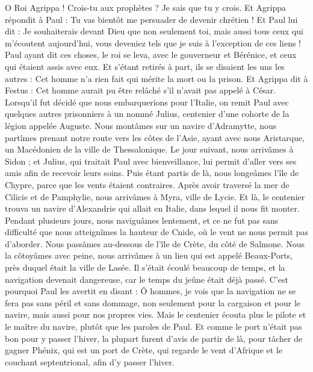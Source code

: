 \begin{multicols}{2}
O Roi Agrippa ! Crois-tu aux prophètes ? Je sais que tu y crois.
Et Agrippa répondit à Paul : Tu vas bientôt me persuader de devenir chrétien !
Et Paul lui dit : Je souhaiterais devant Dieu que non seulement toi, mais aussi tous ceux qui m'écoutent aujourd'hui, vous deveniez tels que je suis à l’exception de ces liens !
Paul ayant dit ces choses, le roi se leva, avec le gouverneur et Bérénice, et ceux qui étaient assis avec eux.
Et s’étant retirés à part, ils se disaient les uns les autres : Cet homme n'a rien fait qui mérite la mort ou la prison.
Et Agrippa dit à Festus : Cet homme aurait pu être relâché s'il n'avait pas appelé à César.
\VerseOne{}Lorsqu’il fut décidé que nous embarquerions pour l’Italie, on remit Paul avec quelques autres prisonniers à un nommé Julius, centenier d'une cohorte de la légion appelée Auguste.
Nous montâmes sur un navire d'Adramytte, nous partîmes prenant notre route vers les côtes de l'Asie, ayant avec nous Aristarque, un Macédonien de la ville de Thessalonique.
Le jour suivant, nous arrivâmes à Sidon ; et Julius, qui traitait Paul avec bienveillance, lui permit d'aller vers ses amis afin de recevoir leurs soins.
Puis étant partis de là, nous longeâmes l’île de Chypre, parce que les vents étaient contraires.
Après avoir traversé la mer de Cilicie et de Pamphylie, nous arrivâmes à Myra, ville de Lycie.
Et là, le centenier trouva un navire d'Alexandrie qui allait en Italie, dans lequel il nous fit monter.
Pendant plusieurs jours, nous naviguâmes lentement, et ce ne fut pas sans difficulté que nous atteignîmes la hauteur de Cnide, où le vent ne nous permit pas d’aborder. Nous passâmes au-dessous de l’île de Crète, du côté de Salmone.
Nous la côtoyâmes avec peine, nous arrivâmes à un lieu qui est appelé Beaux-Ports, près duquel était la ville de Lasée.
Il s’était écoulé beaucoup de temps, et la navigation devenait dangereuse, car le temps du jeûne était déjà passé.
C’est pourquoi Paul les avertit en disant : Ô hommes, je vois que la navigation ne se fera pas sans péril et sans dommage, non seulement pour la cargaison et pour le navire, mais aussi pour nos propres vies.
Mais le centenier écouta plus le pilote et le maître du navire, plutôt que les paroles de Paul.
Et comme le port n'était pas bon pour y passer l'hiver, la plupart furent d'avis de partir de là, pour tâcher de gagner Phénix, qui est un port de Crète, qui regarde le vent d’Afrique et le couchant septentrional, afin d’y passer l'hiver.

\end{multicols}
